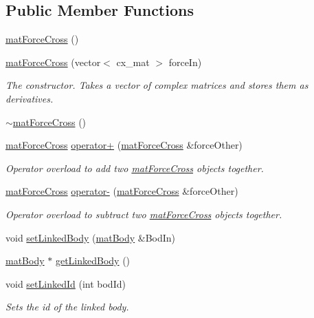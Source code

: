 \subsection*{Public Member Functions}
\begin{DoxyCompactItemize}
\item 
\hyperlink{classmat_force_cross_a8ceccb692bece20135f104f2f78dcf20}{mat\-Force\-Cross} ()
\item 
\hyperlink{classmat_force_cross_ac739dde3edc797503742fa8056b85f1c}{mat\-Force\-Cross} (vector$<$ cx\-\_\-mat $>$ force\-In)
\begin{DoxyCompactList}\small\item\em The constructor. Takes a vector of complex matrices and stores them as derivatives. \end{DoxyCompactList}\item 
\hyperlink{classmat_force_cross_a2eb0a76db0d4f994287d8368699bb036}{$\sim$mat\-Force\-Cross} ()
\item 
\hyperlink{classmat_force_cross}{mat\-Force\-Cross} \hyperlink{classmat_force_cross_a9cb8a17edf38bebb728ff47261175614}{operator+} (\hyperlink{classmat_force_cross}{mat\-Force\-Cross} \&force\-Other)
\begin{DoxyCompactList}\small\item\em Operator overload to add two \hyperlink{classmat_force_cross}{mat\-Force\-Cross} objects together. \end{DoxyCompactList}\item 
\hyperlink{classmat_force_cross}{mat\-Force\-Cross} \hyperlink{classmat_force_cross_af22b49c1536dc753f99b34a3eba1c8e7}{operator-\/} (\hyperlink{classmat_force_cross}{mat\-Force\-Cross} \&force\-Other)
\begin{DoxyCompactList}\small\item\em Operator overload to subtract two \hyperlink{classmat_force_cross}{mat\-Force\-Cross} objects together. \end{DoxyCompactList}\item 
void \hyperlink{classmat_force_cross_a546ca085994682e1e8160ce3014ffaae}{set\-Linked\-Body} (\hyperlink{classmat_body}{mat\-Body} \&Bod\-In)
\item 
\hyperlink{classmat_body}{mat\-Body} $\ast$ \hyperlink{classmat_force_cross_a240be184a1a56ac5541ea0acfbcb9ec5}{get\-Linked\-Body} ()
\item 
void \hyperlink{classmat_force_cross_a285c83c27df6413f90665480d2f3a4ed}{set\-Linked\-Id} (int bod\-Id)
\begin{DoxyCompactList}\small\item\em Sets the id of the linked body. \end{DoxyCompactList}\item 

\end{DoxyCompactItemize}
